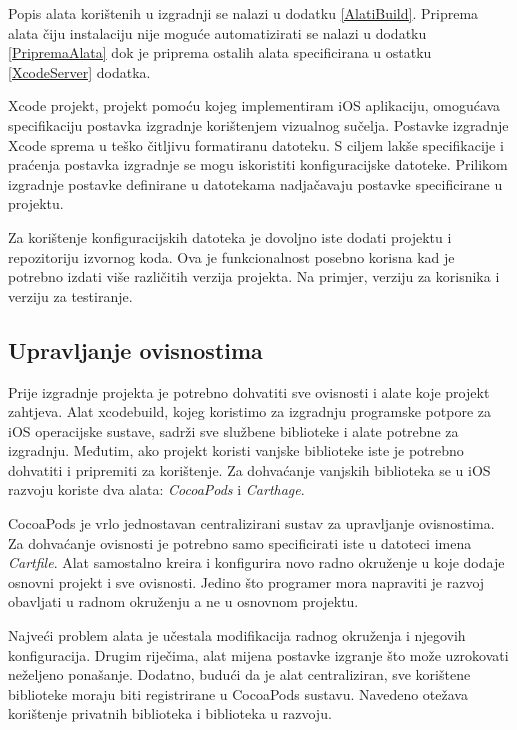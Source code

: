 \documentclass[times, utf8, diplomski, numeric]{fer}
\begin{document}
Popis alata korištenih u izgradnji se nalazi u dodatku \ref{AlatiBuild}. Priprema alata čiju instalaciju nije moguće automatizirati se nalazi u dodatku \ref{PripremaAlata} dok je priprema ostalih alata specificirana u ostatku \ref{XcodeServer} dodatka.

Xcode projekt, projekt pomoću kojeg implementiram iOS aplikaciju, omogućava specifikaciju postavka izgradnje korištenjem vizualnog sučelja. Postavke izgradnje Xcode sprema u teško čitljivu formatiranu datoteku. S ciljem lakše specifikacije i praćenja postavka izgradnje se mogu iskoristiti konfiguracijske datoteke. Prilikom izgradnje postavke definirane u datotekama nadjačavaju postavke specificirane u projektu.

Za korištenje konfiguracijskih datoteka je dovoljno iste dodati projektu i repozitoriju izvornog koda. Ova je funkcionalnost posebno korisna kad je potrebno izdati više različitih verzija projekta. Na primjer, verziju za korisnika i verziju za testiranje.

\subsection{Upravljanje ovisnostima}

Prije izgradnje projekta je potrebno dohvatiti sve ovisnosti i alate koje projekt zahtjeva. Alat xcodebuild, kojeg koristimo za izgradnju programske potpore za iOS operacijske sustave, sadrži sve službene biblioteke i alate potrebne za izgradnju. Međutim, ako projekt koristi vanjske biblioteke iste je potrebno dohvatiti i pripremiti za korištenje. Za dohvaćanje vanjskih biblioteka se u iOS razvoju koriste dva alata: \textit{CocoaPods} i \textit{Carthage}.

CocoaPods je vrlo jednostavan centralizirani sustav za upravljanje ovisnostima. Za dohvaćanje ovisnosti je potrebno samo specificirati iste u datoteci imena \textit{Cartfile}. Alat samostalno kreira i konfigurira novo radno okruženje u koje dodaje osnovni projekt i sve ovisnosti. Jedino što programer mora napraviti je razvoj obavljati u radnom okruženju a ne u osnovnom projektu.

Najveći problem alata je učestala modifikacija radnog okruženja i njegovih konfiguracija. Drugim riječima, alat mijena postavke izgranje što može uzrokovati neželjeno ponašanje. Dodatno, budući da je alat centraliziran, sve korištene biblioteke moraju biti registrirane u CocoaPods sustavu. Navedeno otežava korištenje privatnih biblioteka i biblioteka u razvoju.
\end{document}
